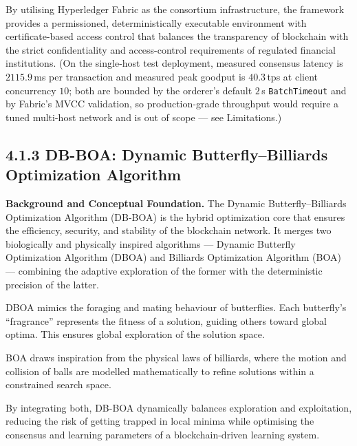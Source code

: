By utilising Hyperledger Fabric as the consortium infrastructure, the framework provides a permissioned, deterministically executable environment with certificate-based access control that balances the transparency of blockchain with the strict confidentiality and access-control requirements of regulated financial institutions. (On the single-host test deployment, measured consensus latency is $2115.9$\,ms per transaction and measured peak goodput is $40.3$\,tps at client concurrency $10$; both are bounded by the orderer's default $2$\,s \texttt{BatchTimeout} and by Fabric's MVCC validation, so production-grade throughput would require a tuned multi-host network and is out of scope --- see Limitations.)

\subsection*{4.1.3 DB-BOA: Dynamic Butterfly–Billiards Optimization Algorithm}

\textbf{Background and Conceptual Foundation.}
The Dynamic Butterfly–Billiards Optimization Algorithm (DB-BOA) is the hybrid optimization core that ensures the efficiency, security, and stability of the blockchain network. It merges two biologically and physically inspired algorithms — Dynamic Butterfly Optimization Algorithm (DBOA) and Billiards Optimization Algorithm (BOA) — combining the adaptive exploration of the former with the deterministic precision of the latter.

DBOA mimics the foraging and mating behaviour of butterflies. Each butterfly's ``fragrance'' represents the fitness of a solution, guiding others toward global optima. This ensures global exploration of the solution space.

BOA draws inspiration from the physical laws of billiards, where the motion and collision of balls are modelled mathematically to refine solutions within a constrained search space.

By integrating both, DB-BOA dynamically balances exploration and exploitation, reducing the risk of getting trapped in local minima while optimising the consensus and learning parameters of a blockchain-driven learning system.

